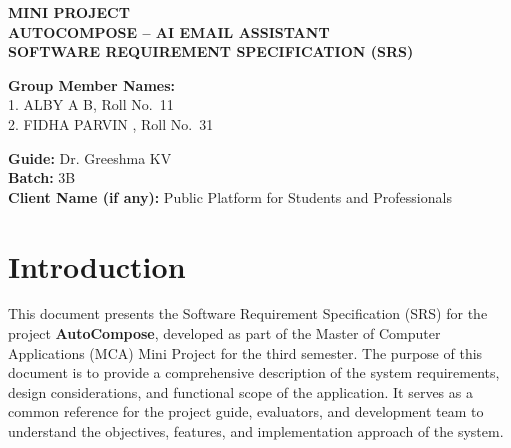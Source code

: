 \documentclass[12pt,a4paper]{article}
\newcommand{\ProjectTitle}{AUTOCOMPOSE -- AI EMAIL ASSISTANT}
\begin{document}
\begin{titlepage}
\centering
\vspace*{1.2cm}

{\fontsize{14}{17}\selectfont\bfseries MINI PROJECT}\\[2.2cm]

{\fontsize{20}{24}\selectfont\bfseries \ProjectTitle}\\[1.4cm]

{\fontsize{16}{19}\selectfont\bfseries SOFTWARE REQUIREMENT SPECIFICATION (SRS)}\\[2.4cm]

\begin{flushleft}
\fontsize{12}{16}\selectfont
\textbf{Group Member Names:}\\[0.3cm]
1. \quad ALBY A B, \quad Roll No.\ 11\\
2. \quad FIDHA PARVIN , \quad Roll No.\ 31\\
\vspace{0.9cm}

\textbf{Guide:} Dr. Greeshma KV\\[0.5cm]
\textbf{Batch:} 3B\\[0.5cm]
\textbf{Client Name (if any):}  Public Platform for Students and Professionals
\end{flushleft}

\end{titlepage}

\tableofcontents
\newpage

\section{Introduction}

This document presents the Software Requirement Specification (SRS) for the project \textbf{AutoCompose}, developed as part of the Master of Computer Applications (MCA) Mini Project for the third semester. The purpose of this document is to provide a comprehensive description of the system requirements, design considerations, and functional scope of the application. It serves as a common reference for the project guide, evaluators, and development team to understand the objectives, features, and implementation approach of the system.
\end{document}
